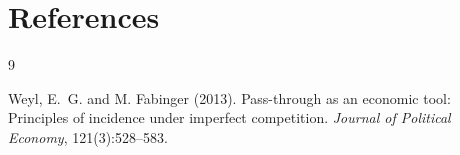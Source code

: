 \documentclass[11pt]{article}
\begin{document}
\section*{References}
\begin{thebibliography}{9}

Weyl, E.~G. and M. Fabinger (2013).
\newblock Pass-through as an economic tool: Principles of incidence under
  imperfect competition.
\newblock \emph{Journal of Political Economy}, 121(3):528--583.

\end{thebibliography}
\end{document}
